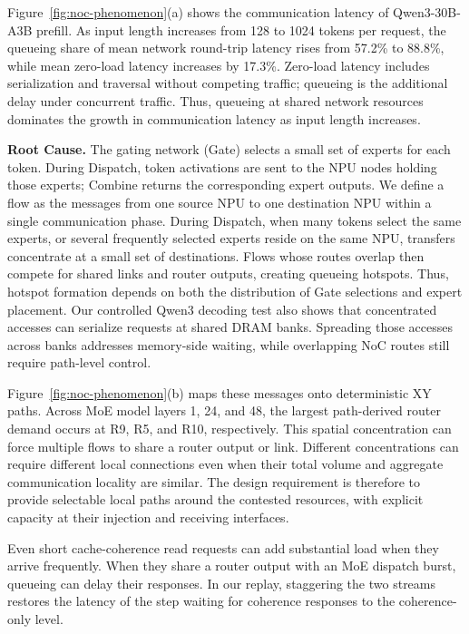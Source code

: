 \documentclass[conference,10pt]{IEEEtran}
\begin{document}
Figure~\ref{fig:noc-phenomenon}(a) shows the communication latency of
Qwen3-30B-A3B prefill. As input length increases
from 128 to 1024 tokens per request, the queueing share of mean network
round-trip latency rises from 57.2\% to 88.8\%, while mean zero-load latency
increases by 17.3\%. Zero-load latency includes serialization and traversal
without competing traffic; queueing is the additional delay under concurrent
traffic. Thus, queueing at shared network resources dominates the growth in
communication latency as input length increases.

\noindent\textbf{Root Cause.}
The gating network (Gate) selects a small set of experts for each token.
During Dispatch, token activations are sent to the NPU nodes holding those
experts; Combine returns the corresponding expert outputs. We define a flow
as the messages from one source NPU to one destination NPU within a single
communication phase. During Dispatch, when many tokens select the same experts, or several
frequently selected experts reside on the same NPU, transfers concentrate at
a small set of destinations. Flows whose routes overlap then compete for
shared links and router outputs, creating queueing hotspots. Thus, hotspot
formation depends on both the distribution of Gate selections and expert placement.
Our controlled Qwen3 decoding test also shows that concentrated accesses
can serialize requests at shared DRAM banks. Spreading those accesses across
banks addresses memory-side waiting, while overlapping NoC routes still
require path-level control.

Figure~\ref{fig:noc-phenomenon}(b) maps these messages onto deterministic XY paths.
Across MoE model layers 1, 24, and 48, the largest path-derived router demand
occurs at R9, R5, and R10, respectively. This spatial concentration can force multiple flows to share a
router output or link. Different concentrations can require different local
connections even when their total volume and aggregate communication locality
are similar. The design requirement is therefore to provide selectable local
paths around the contested resources, with explicit capacity at their
injection and receiving interfaces.

Even short cache-coherence read requests can add substantial load when
they arrive frequently. When they share a router output with an MoE
dispatch burst, queueing can delay their responses. In our replay,
staggering the two streams restores the latency of the step waiting for
coherence responses to the coherence-only level.
\end{document}
